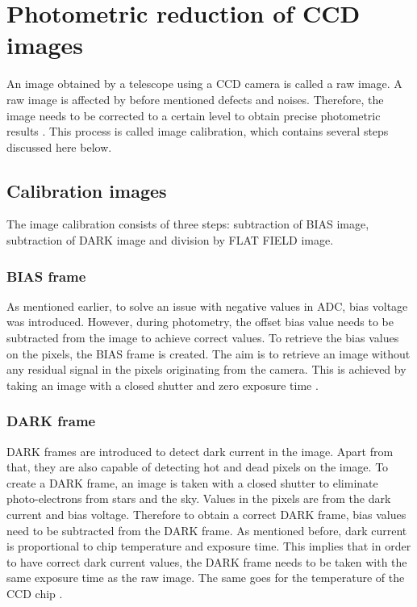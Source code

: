 \section{Photometric reduction of CCD images} \label{sec:photoreduction}


An image obtained by a telescope using a CCD camera is called a raw image. A raw image is affected by before mentioned defects and noises. Therefore, the image needs to be corrected to a certain level to obtain precise photometric results \cite{articleParimucha}. This process is called image calibration, which contains several steps discussed here below.  

\subsection{Calibration images}
The image calibration consists of three steps: subtraction of BIAS image, subtraction of DARK image and division by FLAT FIELD image.

    \subsubsection{BIAS frame}
    As mentioned earlier, to solve an issue with negative values in ADC, bias voltage was introduced.
    However, during photometry, the offset bias value needs to be subtracted from the image to achieve correct values. To retrieve the bias values on the pixels, the BIAS frame is created. 
    The aim is to retrieve an image without any residual signal in the pixels originating from the camera. This is achieved by taking an image with a closed shutter and zero exposure time \cite{articleParimucha}.
     
             
    \subsubsection{DARK frame} 

    DARK frames are introduced to detect dark current in the image. Apart from that, they are also capable of detecting hot and dead pixels on the image. 
    To create a DARK frame, an image is taken with a closed shutter to eliminate photo-electrons from stars and the sky. Values in the pixels are from the dark current and bias voltage. Therefore to obtain a correct DARK frame, bias values need to be subtracted from the DARK frame. 
    As mentioned before, dark current is proportional to chip temperature and exposure time. This implies that in order to have correct dark current values, the DARK frame needs to be taken with the same exposure time as the raw image. The same goes for the temperature of the CCD chip \cite{articleParimucha} \cite{articleCcdOnline} \cite{phy217}. 
    


